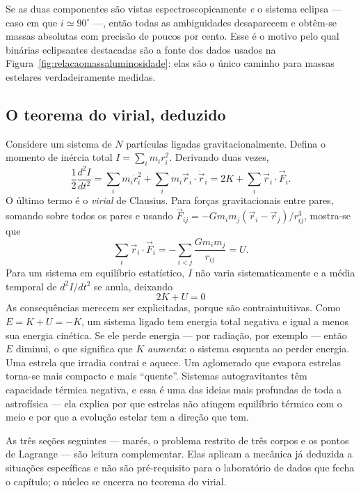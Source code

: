 \documentclass[11pt,a4paper]{article}
\begin{document}
Se as duas componentes são vistas espectroscopicamente \emph{e} o sistema eclipsa --- caso em que $i\simeq90^\circ$ ---, então todas as ambiguidades desaparecem e obtêm-se massas absolutas com precisão de poucos por cento. Esse é o motivo pelo qual binárias eclipsantes destacadas são a fonte dos dados usados na Figura~\ref{fig:relacaomassaluminosidade}: elas são o único caminho para massas estelares verdadeiramente medidas.

\subsection*{O teorema do virial, deduzido}

Considere um sistema de $N$ partículas ligadas gravitacionalmente. Defina o momento de inércia total $I=\sum_i m_ir_i^{2}$. Derivando duas vezes,
\[
\frac{1}{2}\frac{d^{2}I}{dt^{2}}=\sum_i m_i\dot{r}_i^{2}+\sum_i m_i\vec{r}_i\cdot\ddot{\vec{r}}_i
=2K+\sum_i\vec{r}_i\cdot\vec{F}_i.
\]
O último termo é o \textit{virial} de Clausius. Para forças gravitacionais entre pares, somando sobre todos os pares e usando $\vec{F}_{ij}=-Gm_im_j(\vec{r}_i-\vec{r}_j)/r_{ij}^{3}$, mostra-se que
\[
\sum_i\vec{r}_i\cdot\vec{F}_i=-\sum_{i<j}\frac{Gm_im_j}{r_{ij}}=U.
\]
Para um sistema em equilíbrio estatístico, $I$ não varia sistematicamente e a média temporal de $d^{2}I/dt^{2}$ se anula, deixando
\[
\boxed{\ 2K+U=0\ }
\]
As consequências merecem ser explicitadas, porque são contraintuitivas. Como $E=K+U=-K$, um sistema ligado tem energia total negativa e igual a menos sua energia cinética. Se ele perde energia --- por radiação, por exemplo --- então $E$ diminui, o que significa que $K$ \emph{aumenta}: o sistema esquenta ao perder energia. Uma estrela que irradia contrai e aquece. Um aglomerado que evapora estrelas torna-se mais compacto e mais ``quente''. Sistemas autogravitantes têm capacidade térmica negativa, e essa é uma das ideias mais profundas de toda a astrofísica --- ela explica por que estrelas não atingem equilíbrio térmico com o meio e por que a evolução estelar tem a direção que tem.

\begin{noticebox}
As três seções seguintes --- marés, o problema restrito de três corpos e os pontos de Lagrange --- são leitura
complementar. Elas aplicam a mecânica já deduzida a situações específicas e não são pré-requisito para o laboratório de
dados que fecha o capítulo; o núcleo se encerra no teorema do virial.
\end{noticebox}
\end{document}

